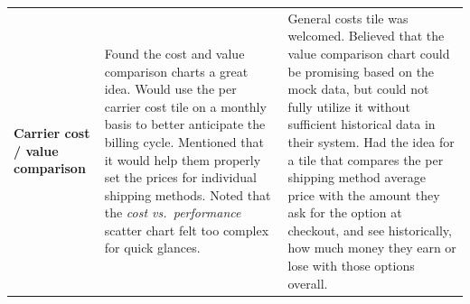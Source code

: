 \documentclass{imc-inf}
\begin{document}
\begin{longtable}{@{}>{\raggedright\arraybackslash}p{3cm}p{5.75cm}p{5.75cm}@{}}
  \textbf{Carrier cost / value comparison}                                                                                                                                                                                                                                                                                                                                                                                                                                                                                                                                                                                                                                                                                                                                                                                                                                                                     &
  Found the cost and value comparison charts a great idea. Would use the per carrier cost tile on a monthly basis to better anticipate the billing cycle. Mentioned that it would help them properly set the prices for individual shipping methods. Noted that the \textit{cost vs.\ performance} scatter chart felt too complex for quick glances.                                                                                                                                                                                                                                                                                                                                                                                                                                                                                                                                                           &
  General costs tile was welcomed. Believed that the value comparison chart could be promising based on the mock data, but could not fully utilize it without sufficient historical data in their system. Had the idea for a tile that compares the per shipping method average price with the amount they ask for the option at checkout, and see historically, how much money they earn or lose with those options overall.                                                                                                                                                                                                                                                                                                                                                                                                                                                                                                                              \\[6pt]


\end{longtable}
\end{document}
